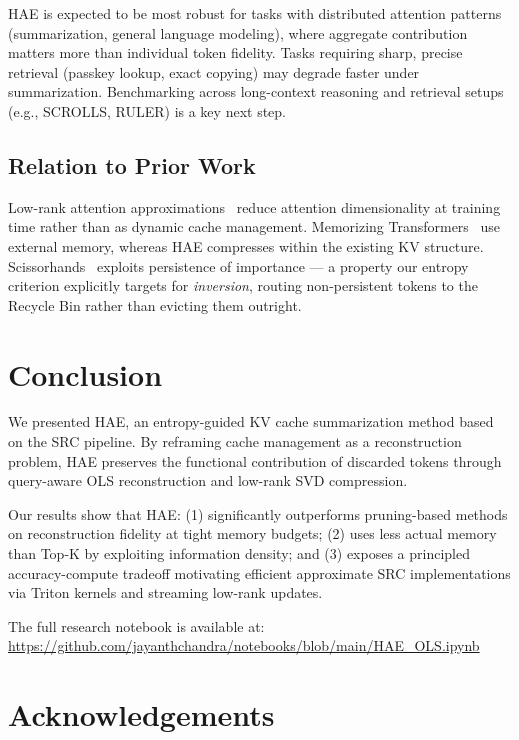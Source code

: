 \documentclass[11pt,a4paper]{article}
\begin{document}
HAE is expected to be most robust for tasks with distributed attention patterns (summarization, general language modeling), where aggregate contribution matters more than individual token fidelity. Tasks requiring sharp, precise retrieval (passkey lookup, exact copying) may degrade faster under summarization. Benchmarking across long-context reasoning and retrieval setups (e.g., SCROLLS, RULER) is a key next step.

\subsection{Relation to Prior Work}

Low-rank attention approximations~\citep{wang2020linformer, chen2021scatterbrain} reduce attention dimensionality at training time rather than as dynamic cache management. Memorizing Transformers~\citep{wu2022memorizing} use external memory, whereas HAE compresses within the existing KV structure. Scissorhands~\citep{liu2023scissorhands} exploits persistence of importance --- a property our entropy criterion explicitly targets for \emph{inversion}, routing non-persistent tokens to the Recycle Bin rather than evicting them outright.

\section{Conclusion}

We presented HAE, an entropy-guided KV cache summarization method based on the SRC pipeline. By reframing cache management as a reconstruction problem, HAE preserves the functional contribution of discarded tokens through query-aware OLS reconstruction and low-rank SVD compression.

Our results show that HAE: (1) significantly outperforms pruning-based methods on reconstruction fidelity at tight memory budgets; (2) uses less actual memory than Top-K by exploiting information density; and (3) exposes a principled accuracy-compute tradeoff motivating efficient approximate SRC implementations via Triton kernels and streaming low-rank updates.

\vspace{0.5em}
\noindent The full research notebook is available at: \url{https://github.com/jayanthchandra/notebooks/blob/main/HAE_OLS.ipynb}

\section*{Acknowledgements}
\end{document}
